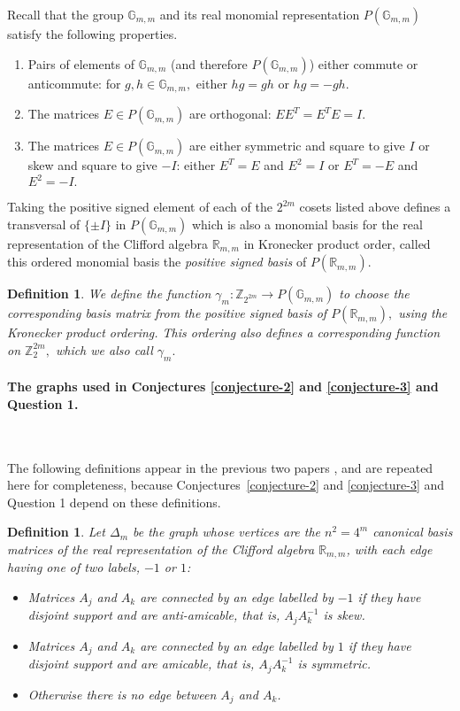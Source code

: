 \documentclass[12pt,a4paper]{article}
\newcommand{\mb}[1]{\mathbb{#1}}
\newcommand{\G}{\mb{G}}
\newcommand{\R}{\mb{R}}
\newcommand{\Z}{\mb{Z}}
\newcommand{\Rep}{P}
\newcommand{\To}{\rightarrow}
\newtheorem*{definition}{Definition}
\newtheorem{Definition}{Definition}
\begin{document}
Recall that
the group $\G_{m,m}$ and its real monomial representation $\Rep(\G_{m,m})$ 
satisfy the following properties.
\begin{enumerate}
\item 
Pairs of elements of $\G_{m,m}$ (and therefore $\Rep(\G_{m,m})$) either commute or anti\-commute:
for $g, h \in \G_{m,m},$ either $h g = g h$ or $h g = - g h.$
\item
The matrices $E \in \Rep(\G_{m,m})$ are orthogonal: $E E^T = E^T E = I.$
\item
The matrices $E \in \Rep(\G_{m,m})$ are either symmetric and square to give $I$ or 
skew and square to give $-I$: either $E^T = E$ and $E^2 =I$ or $E^T = -E$ and $E^2 = -I.$
\end{enumerate}

Taking the positive signed element of each of the $2^{2m}$ cosets listed above
defines a transversal of $\{\pm I\}$ in $\Rep(\G_{m,m})$
which is also a monomial basis for the real representation of the Clifford algebra $\R_{m,m}$ in 
Kronecker product order,
called this ordered monomial basis the \emph{positive signed basis} of $\Rep(\R_{m,m}).$ 

\begin{definition}\label{definition-gamma}
We define the function $\gamma_m : \Z_{2^{2 m}} \To \Rep(\G_{m,m})$ 
to choose the corresponding basis matrix from the positive signed basis of $\Rep(\R_{m,m}),$
using the Kronecker product ordering.
This ordering also defines a corresponding function on $\Z_2^{2 m},$
which we also call $\gamma_m.$
\end{definition}

\paragraph*{The graphs used in Conjectures \ref{conjecture-2} and \ref{conjecture-3} and Question 1.}
\label{sec-Graphs}

~

The following definitions appear in the previous two papers \cite{Leo14Constructions,Leo15Bent},
and are repeated here for completeness, because Conjectures~\ref{conjecture-2} and \ref{conjecture-3} and Question 1 depend on these definitions.

\begin{Definition}\label{definition-delta}
Let $\varDelta_m$ be the graph whose vertices are the $n^2=4^m$ 
canonical basis matrices of the real representation
of the Clifford algebra $\R_{m,m}$,
with each edge having one of two labels, $-1$ or $1$:
\begin{itemize}
\item 
Matrices $A_j$ and $A_k$ are connected by an edge labelled by $-1$ if they have disjoint support and are anti-amicable,
that is, $A_j A_k^{-1}$ is skew.
\item 
Matrices $A_j$ and $A_k$ are connected by an edge labelled by $1$ if they have disjoint support and are amicable,
that is, $A_j A_k^{-1}$ is symmetric.
\item 
Otherwise there is no edge between $A_j$ and $A_k$.
\end{itemize}
\end{Definition}
\end{document}
